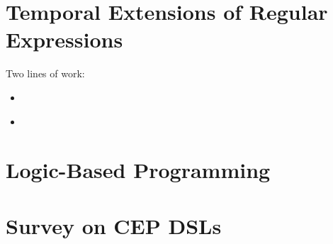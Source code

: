 \section{Temporal Extensions of Regular Expressions}
\label{sec:DSL-REG}

Two lines of work:
\begin{itemize}
	\item \cite{Brenna-etAl:2007}
	\item \cite{Diao-Immerman-Gyllstrom:2007,Gyllstrom-Agrawal-Diao-Immerman:2008}
\end{itemize}

\section{Logic-Based Programming \cite{Anicic-Fodor-etAl:2011}}
\label{sec:DSL-Logic}

\section{Survey on CEP DSLs \cite{Eckert-Bry-etAl:2011,J:Cugola-Margara:2011}}
\label{sec:DSL-Survey}


